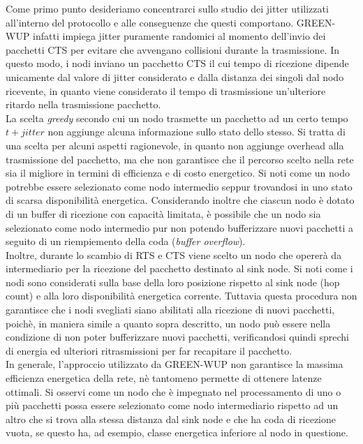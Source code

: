 \documentclass[binding=0.6cm,TFA]{sapthesis}
\begin{document}
Come primo punto desideriamo concentrarci sullo studio dei jitter utilizzati all'interno del protocollo e alle conseguenze che questi comportano.
GREEN-WUP infatti impiega jitter puramente randomici al momento dell'invio dei pacchetti CTS per evitare che avvengano collisioni durante
la trasmissione. In questo modo, i nodi inviano un pacchetto CTS il cui tempo di ricezione dipende unicamente dal valore di jitter
considerato e dalla distanza dei singoli dal nodo ricevente, in quanto viene considerato il tempo di trasmissione un'ulteriore ritardo nella
trasmissione pacchetto.\\

La scelta \emph{greedy} secondo cui un nodo trasmette un pacchetto ad un certo tempo $t+jitter$ non aggiunge alcuna
informazione sullo stato dello stesso. Si tratta di una scelta per alcuni aspetti ragionevole, in quanto non aggiunge overhead alla trasmissione
del pacchetto, ma che non garantisce che il percorso scelto nella rete sia il migliore in termini di efficienza e di costo energetico. Si noti come
un nodo potrebbe essere selezionato come nodo intermedio seppur trovandosi in uno stato di scarsa disponibilità energetica. Considerando inoltre che
ciascun nodo è dotato di un buffer di ricezione con capacità limitata, è possibile che un nodo sia selezionato come nodo intermedio pur non
potendo bufferizzare nuovi pacchetti a seguito di un riempiemento della coda (\emph{buffer overflow}).\\

Inoltre, durante lo scambio di RTS e CTS viene scelto un nodo che opererà da intermediario per la ricezione del pacchetto destinato
al sink node. Si noti come i nodi sono considerati sulla base della loro posizione rispetto al sink node (hop count) e alla loro
disponibilità energetica corrente. Tuttavia questa procedura non garantisce che i nodi svegliati siano abilitati alla ricezione di nuovi pacchetti,
poichè, in maniera simile a quanto sopra descritto, un nodo può essere nella condizione di non poter bufferizzare nuovi pacchetti, verificandosi
quindi sprechi di energia ed ulteriori ritrasmissioni per far recapitare il pacchetto.\\

In generale, l'approccio utilizzato da GREEN-WUP non garantisce la massima efficienza energetica della rete, nè tantomeno permette di ottenere latenze ottimali.
Si osservi come un nodo che è impegnato nel processamento di uno o più pacchetti possa essere selezionato come nodo intermediario rispetto ad un altro che si
trova alla stessa distanza dal sink node e che ha coda di ricezione vuota, se questo ha, ad esempio, classe energetica inferiore al nodo in questione. \\
\end{document}
